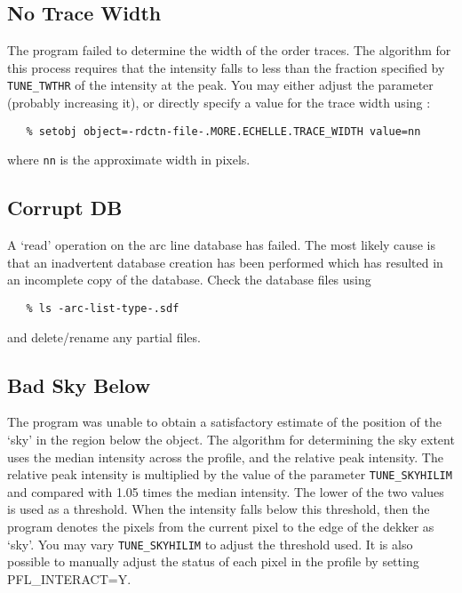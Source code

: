 \subsection{ No Trace Width}

The program failed to determine the width of the order traces. The
algorithm for this process requires that the intensity falls to less
than the fraction specified by \verb+TUNE_TWTHR+ of the intensity at the
peak.  You may either adjust the parameter (probably increasing it),
or directly specify a value for the trace width using
:

\begin{verbatim}
   % setobj object=-rdctn-file-.MORE.ECHELLE.TRACE_WIDTH value=nn
\end{verbatim}

where {\tt nn} is the approximate width in pixels.


\subsection{ Corrupt DB}

A `read' operation on the arc line database has failed. The most likely
cause is that an inadvertent database creation has been performed which
has resulted in an incomplete copy of the database.  Check the database
files using

\begin{verbatim}
   % ls -arc-list-type-.sdf
\end{verbatim}

and delete/rename any partial files.

\subsection{ Bad Sky Below}

The program was unable to obtain a satisfactory estimate of the position
of the `sky' in the region below the object. The algorithm for
determining the sky extent uses the median intensity across the profile,
and the relative peak intensity. The relative peak intensity is
multiplied by the value of the parameter \verb+TUNE_SKYHILIM+ and compared
with 1.05 times the median intensity. The lower of the two values is used as
a threshold. When the intensity falls below this threshold,  then the
program denotes the pixels from the current pixel to the edge of the
dekker as `sky'.  You may vary \verb+TUNE_SKYHILIM+ to adjust the
threshold used. It is also possible to manually adjust the status of
each pixel in the profile by setting PFL\_INTERACT=Y.

